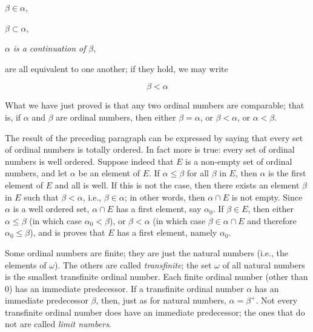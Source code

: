 \begin{center}
$\beta \in \alpha$,

$\beta \subset \alpha$,

$\alpha$ \textit{is a continuation of} $\beta$,
\end{center}

are all equivalent to one another; if they hold, we may write

\begin{equation*}
\beta < \alpha
\end{equation*}

What we have just proved is that any two ordinal numbers are comparable; that is, if $\alpha$ and $\beta$ are ordinal numbers, then either $\beta = \alpha$, or $\beta < \alpha$, or $\alpha < \beta$. 

The result of the preceding paragraph can be expressed by saying that every set of ordinal numbers is totally ordered. In fact more is true: every set of ordinal numbers is well ordered. Suppose indeed that $E$ is a non-empty set of ordinal numbers, and let $\alpha$ be an element of $E$. If $\alpha \le  \beta$ for all $\beta$ in $E$, then $\alpha$ is the first element of $E$ and all is well. If this is not the case, then there exists an element $\beta$ in $E$ such that $\beta < \alpha$, i.e., $\beta \in \alpha$; in other words, then $\alpha \cap E$ is not empty. Since $\alpha$ is a well ordered set, $\alpha \cap E$ has a first element, say $\alpha_{0}$. If $\beta \in E$, then either $\alpha \le \beta$ (in which case $\alpha_{0} < \beta$), or $\beta < \alpha$ (in which case $\beta \in \alpha \cap E$ and therefore $\alpha_{0} \le \beta$), and is proves that $E$ has a first element, namely $\alpha_{0}$.

Some ordinal numbers are finite; they are just the natural numbers (i.e., the elements of $\omega$). The others are called \textit{transfinite}; the set $\omega$ of all natural numbers is the smallest transfinite ordinal number. Each finite ordinal number (other than $0$) has an immediate predecessor. If a transfinite ordinal number $\alpha$ has an immediate predecessor $\beta$, then, just as for natural numbers, $\alpha = \beta^{+}$. Not every transfinite ordinal number does have an immediate predecessor; the ones that do not are called \textit{limit numbers}. 

